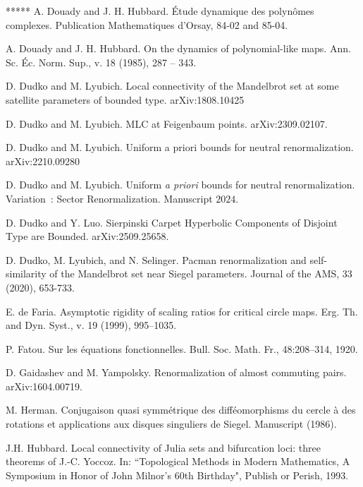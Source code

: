 \documentclass{amsart}
\newcommand{\1}{{\mathbb 1 }}
\theoremstyle{remark}
\numberwithin{equation}{section}
\theoremstyle{definition}
\newcommand{\RN}[1]{\MakeUppercase{\romannumeral#1}}%
\begin{document}
\begin{thebibliography}{*****}
 A. Douady and J. H. Hubbard.
  \'{E}tude dynamique des polyn\^{o}mes complexes.
 Publication Mathematiques d'Orsay,
84-02 and 85-04.

 A. Douady and J. H. Hubbard. On the dynamics of polynomial-like maps.
   Ann. Sc. \'{E}c. Norm. Sup., v. 18 (1985), 287 -- 343.




 D. Dudko and M. Lyubich. Local connectivity of the Mandelbrot set at some satellite parameters of bounded type. arXiv:1808.10425

 D. Dudko and M. Lyubich. MLC at Feigenbaum points. arXiv:2309.02107.

 D. Dudko and M. Lyubich. Uniform a priori bounds for neutral renormalization. arXiv:2210.09280


 D. Dudko and M. Lyubich. Uniform \emph{a priori} bounds for neutral renormalization. Variation~\RN{1}:  Sector Renormalization. Manuscript $2024$.




 D. Dudko and Y. Luo. Sierpinski Carpet Hyperbolic Components of Disjoint Type are Bounded. arXiv:2509.25658.


 D. Dudko, M. Lyubich, and N. Selinger. Pacman renormalization and self-similarity of the Mandelbrot set near Siegel parameters. Journal of the AMS, 33 (2020), 653-733.



 E. de Faria.  Asymptotic rigidity of scaling ratios
  for critical circle maps. Erg. Th. and Dyn. Syst., v. 19 (1999),
  995--1035. 
  

 P. Fatou. Sur les équations fonctionnelles. Bull. Soc. Math. Fr., 48:208–314, 1920.

  
 D. Gaidashev and M. Yampolsky. Renormalization of almost commuting pairs. arXiv:1604.00719.


 M. Herman. Conjugaison quasi symm\'etrique des diff\'eomorphisms du cercle \`a des rotations
et applications aux disques singuliers de Siegel. Manuscript (1986).


 J.H. Hubbard.
   Local connectivity of Julia sets and bifurcation
     loci: three theorems of J.-C. Yoccoz. In:
    ``Topological Methods in Modern Mathematics, A Symposium in
     Honor of John Milnor's 60th Birthday", Publish or Perish, 1993.





\end{thebibliography}
\end{document}

